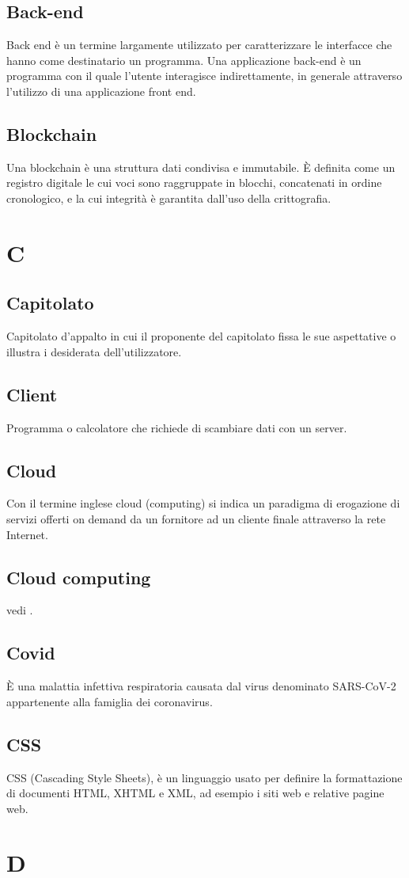 \subsection{Back-end} Back end è un termine largamente utilizzato per caratterizzare le interfacce che hanno come destinatario un programma. Una applicazione back-end è un programma con il quale l'utente interagisce indirettamente, in generale attraverso l'utilizzo di una applicazione front end.
\subsection{Blockchain} Una blockchain è una struttura dati condivisa e immutabile. È definita come un registro
digitale le cui voci sono raggruppate in blocchi, concatenati in ordine cronologico, e la cui integrità è garantita dall'uso della crittografia.
\newpage \section{C}
\subsection{Capitolato} Capitolato d'appalto in cui il proponente del capitolato fissa le sue aspettative o illustra i desiderata dell'utilizzatore.
\subsection{Client} Programma o calcolatore che richiede di scambiare dati con un server.
\subsection{Cloud} Con il termine inglese cloud (computing) si indica un paradigma di erogazione di servizi offerti on demand da un fornitore ad un cliente finale attraverso la rete Internet.
\subsection{Cloud computing} vedi .
\subsection{Covid} È una malattia infettiva respiratoria causata dal virus denominato SARS-CoV-2 appartenente alla famiglia dei coronavirus.
\subsection{CSS} CSS (Cascading Style Sheets), è un linguaggio usato per definire la formattazione di documenti HTML, XHTML e XML, ad esempio i siti web e relative pagine web.
\newpage \section{D}
